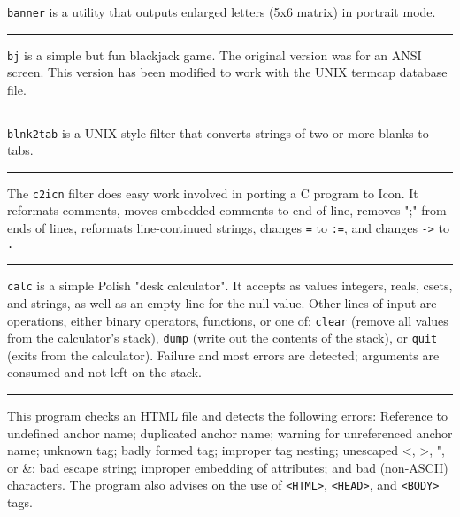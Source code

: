 {\texttt{banner} is a utility that outputs enlarged letters (5x6 matrix) in
portrait mode.

\vspace{0.25cm}\hrule{}

\texttt{bj} is a simple but fun blackjack game. The original version was
for an ANSI screen. This version has been modified to work with the
UNIX termcap database file.

\vspace{0.25cm}\hrule{}

\texttt{blnk2tab} is a UNIX-style filter that converts strings of two or
more blanks to tabs.

\vspace{0.25cm}\hrule{}

The \texttt{c2icn} filter does easy work involved in porting a C
program to Icon. It reformats comments, moves embedded
comments to end of line, removes ";"
from ends of lines, reformats line-continued strings, changes
\texttt{=} to \texttt{:=}, and changes \texttt{{}-{\textgreater}} to
\texttt{.} 

\vspace{0.25cm}\hrule{}

\texttt{calc} is a simple Polish "desk calculator". It accepts as values
integers, reals, csets, and strings, as well as
an empty line for the null value. Other lines of input are operations,
either binary operators, functions, or one of:
\texttt{clear} (remove all values from the
calculator's stack), \texttt{dump} (write out the contents of the stack), or \texttt{quit} (exits from the calculator).
Failure and most errors are detected; arguments are consumed and not
left on the stack.

\vspace{0.25cm}\hrule{}

This program checks an HTML file and detects the following
errors: Reference to undefined anchor name; duplicated anchor name;
warning for unreferenced anchor name; unknown tag; badly formed tag;
improper tag nesting; unescaped {\textless}, {\textgreater}, ", or \&;
bad escape string; improper embedding of attributes; and
bad (non-ASCII) characters.
The program also advises on the use of
\texttt{{\textless}HTML{\textgreater}},
\texttt{{\textless}HEAD{\textgreater}}, and
\texttt{{\textless}BODY{\textgreater}} tags. 

}
